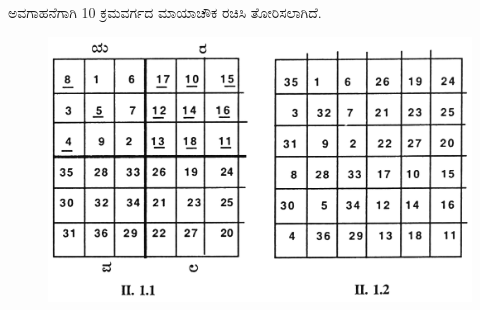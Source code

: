 ಅವಗಾಹನೆಗಾಗಿ 10 ಕ್ರಮವರ್ಗದ ಮಾಯಾಚೌಕ ರಚಿಸಿ ತೋರಿಸಲಾಗಿದೆ.
\begin{figure}[H]
\includegraphics[scale=.97]{src/figures/chap3/fig3-14.jpg}
\end{figure}
